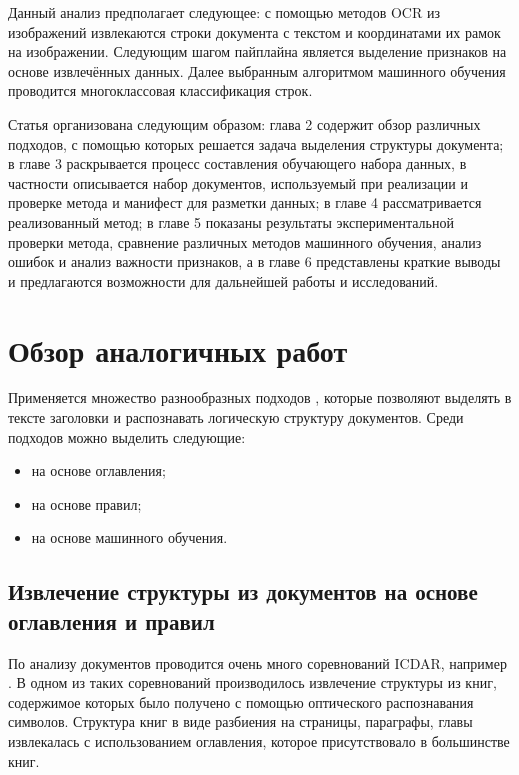 \documentclass{ProcISPRAS}
\begin{document}
Данный анализ предполагает следующее: с помощью методов OCR из изображений извлекаются строки документа с текстом и координатами их рамок на изображении. Следующим шагом пайплайна является выделение признаков на основе извлечённых данных. Далее выбранным алгоритмом машинного обучения проводится многоклассовая классификация строк.

Статья организована следующим образом:
глава 2 содержит обзор различных подходов, с помощью которых решается задача выделения структуры документа; в главе 3 раскрывается процесс составления обучающего набора данных, в частности описывается набор документов, используемый при реализации и проверке метода и манифест для разметки данных; в главе 4 рассматривается реализованный метод; в главе 5 показаны результаты экспериментальной проверки метода, сравнение различных методов машинного обучения, анализ ошибок и анализ важности признаков, а в главе 6 представлены краткие выводы и предлагаются возможности для дальнейшей работы и исследований.

\section{Обзор аналогичных работ}

Применяется множество разнообразных подходов \cite{fintoc19daniel, fintoc19tian, deep}, которые позволяют выделять в тексте заголовки и распознавать логическую структуру документов.
Среди подходов можно выделить следующие:
\begin{itemize}
\item на основе оглавления;
\item на основе правил;
\item на основе машинного обучения.
\end{itemize}

\subsection{Извлечение структуры из документов на основе оглавления и правил}

По анализу документов проводится очень много соревнований ICDAR, например \cite{icdar13, icdar17comp, icdar17}. В одном из таких соревнований \cite{icdar13} производилось извлечение структуры из книг, содержимое которых было получено с помощью оптического распознавания символов. Структура книг в виде разбиения на страницы, параграфы, главы извлекалась с использованием оглавления, которое присутствовало в большинстве книг. 
\end{document}
